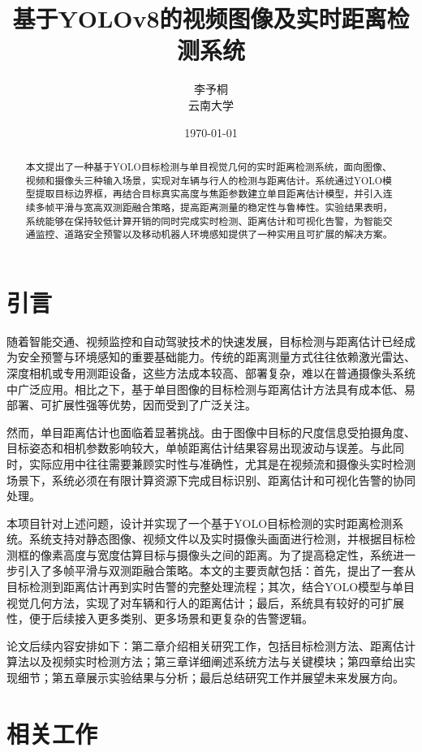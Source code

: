 \documentclass[12pt,a4paper]{article}
\title{基于YOLOv8的视频图像及实时距离检测系统}
\author{李予桐 \\ 云南大学}
\date{\today}
\begin{document}
\maketitle

\begin{abstract}
本文提出了一种基于YOLO目标检测与单目视觉几何的实时距离检测系统，面向图像、视频和摄像头三种输入场景，实现对车辆与行人的检测与距离估计。系统通过YOLO模型提取目标边界框，再结合目标真实高度与焦距参数建立单目距离估计模型，并引入连续多帧平滑与宽高双测距融合策略，提高距离测量的稳定性与鲁棒性。实验结果表明，系统能够在保持较低计算开销的同时完成实时检测、距离估计和可视化告警，为智能交通监控、道路安全预警以及移动机器人环境感知提供了一种实用且可扩展的解决方案。
\end{abstract}

\section{引言}
随着智能交通、视频监控和自动驾驶技术的快速发展，目标检测与距离估计已经成为安全预警与环境感知的重要基础能力。传统的距离测量方式往往依赖激光雷达、深度相机或专用测距设备，这些方法成本较高、部署复杂，难以在普通摄像头系统中广泛应用。相比之下，基于单目图像的目标检测与距离估计方法具有成本低、易部署、可扩展性强等优势，因而受到了广泛关注。

然而，单目距离估计也面临着显著挑战。由于图像中目标的尺度信息受拍摄角度、目标姿态和相机参数影响较大，单帧距离估计结果容易出现波动与误差。与此同时，实际应用中往往需要兼顾实时性与准确性，尤其是在视频流和摄像头实时检测场景下，系统必须在有限计算资源下完成目标识别、距离估计和可视化告警的协同处理。

本项目针对上述问题，设计并实现了一个基于YOLO目标检测的实时距离检测系统。系统支持对静态图像、视频文件以及实时摄像头画面进行检测，并根据目标检测框的像素高度与宽度估算目标与摄像头之间的距离。为了提高稳定性，系统进一步引入了多帧平滑与双测距融合策略。本文的主要贡献包括：首先，提出了一套从目标检测到距离估计再到实时告警的完整处理流程；其次，结合YOLO模型与单目视觉几何方法，实现了对车辆和行人的距离估计；最后，系统具有较好的可扩展性，便于后续接入更多类别、更多场景和更复杂的告警逻辑。

论文后续内容安排如下：第二章介绍相关研究工作，包括目标检测方法、距离估计算法以及视频实时检测方法；第三章详细阐述系统方法与关键模块；第四章给出实现细节；第五章展示实验结果与分析；最后总结研究工作并展望未来发展方向。

\section{相关工作}
\end{document}
